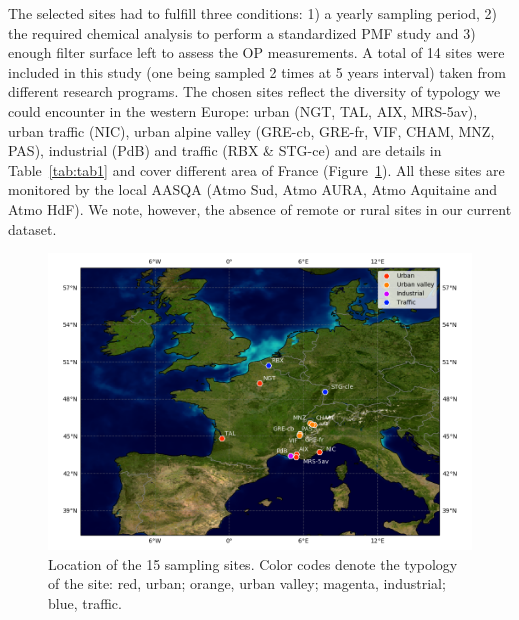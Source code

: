 \documentclass[acp]{copernicus}
\begin{document}
The selected sites had to fulfill three conditions: 1) a yearly sampling
period, 2) the required chemical analysis to perform a standardized PMF
study and 3) enough filter surface left to assess the OP measurements. A
total of 14 sites were included in this study (one being sampled 2 times
at 5 years interval) taken from different research programs. The chosen
sites reflect the diversity of typology we could encounter in the
western Europe: urban (NGT, TAL, AIX, MRS-5av), urban traffic (NIC),
urban alpine valley (GRE-cb, GRE-fr, VIF, CHAM, MNZ, PAS), industrial
(PdB) and traffic (RBX \& STG-ce) and are details in
Table~\ref{tab:tab1} and cover different
area of France (Figure~\ref{fig:fig1}).
All these sites are monitored by the local AASQA (Atmo Sud, Atmo AURA,
Atmo Aquitaine and Atmo HdF). We note, however, the absence of remote or
rural sites in our current dataset.

\begin{figure}[ht]
    \centering
    \includegraphics[width=0.7\linewidth]{figures/fig1.png}
    \caption{
    Location of the 15 sampling sites. Color codes denote the typology of the
    site: red, urban; orange, urban valley; magenta, industrial; blue, traffic.
    }%
    \label{fig:fig1}
\end{figure}
\end{document}
